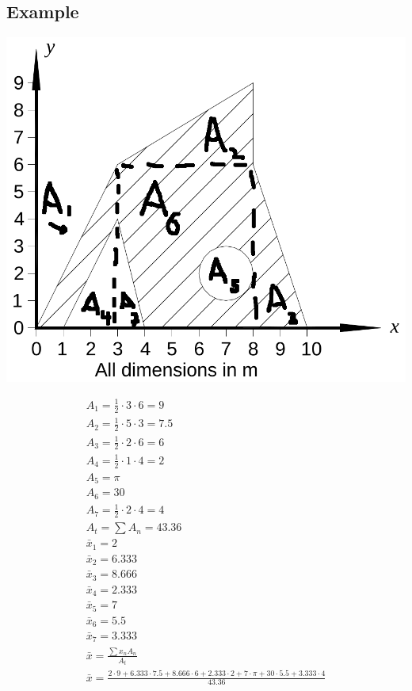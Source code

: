 \documentclass[a4paper, 12pt]{article}
\begin{document}
\subsection{Example}
\begin{center}
\includegraphics[scale=0.15]{centroids}
\end{center}
\begin{equation*}
\begin{gathered}
    A_1 = \frac{1}{2} \cdot 3 \cdot 6 = 9\\
    A_2 = \frac{1}{2} \cdot 5 \cdot 3 = 7.5\\
    A_3 = \frac{1}{2} \cdot 2 \cdot 6 = 6\\
    A_4 = \frac{1}{2} \cdot 1 \cdot 4 = 2\\
    A_5 = \pi \\ 
    A_6 = 30 \\ 
    A_7 = \frac{1}{2} \cdot 2 \cdot 4 = 4\\
    A_t = \sum A_n = 43.36\\ 
    \bar{x}_1 = 2 \\
    \bar{x}_2 = 6.333 \\
    \bar{x}_3 = 8.666 \\
    \bar{x}_4 = 2.333 \\
    \bar{x}_5 = 7 \\
    \bar{x}_6 = 5.5 \\
    \bar{x}_7 = 3.333 \\
    \bar{x} = \frac{\sum x_n A_n}{A_t} \\
    \bar{x} = \frac{2 \cdot 9 + 6.333 \cdot 7.5 + 8.666 \cdot 6 + 2.333 \cdot 2 + 7 \cdot \pi + 30 \cdot 5.5 + 3.333 \cdot 4}{43.36} \\
\end{gathered}
\end{equation*}
\end{document}
